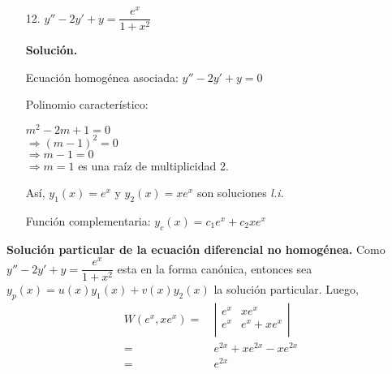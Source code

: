 \documentclass{beamer}
\begin{document}
    \begin{frame}
        \begin{enumerate}
        \item[12.] $ y'' - 2y' + y = \dfrac{e^x}{1+x^2} $ 
            
            \vspace{2.7mm}
            \textbf{Solución.}

            \vspace{0.6mm}
            Ecuación homogénea asociada: $ y'' - 2y' + y = 0 $ 

            \vspace{0.6mm}
            Polinomio característico:

            \vspace{0.6mm}
            $ m^2 - 2m + 1 = 0 $ \\
            $ \Longrightarrow (m - 1)^2 = 0 $ \\
            $ \Longrightarrow m - 1 = 0 $ \\
            $ \Longrightarrow m = 1 $ \; es una raíz de multiplicidad 2.

            \vspace{0.6mm}
            Así, $ y_1(x) = e^x $ y $ y_2(x) = xe^x $ son soluciones \emph{l.i.}

            \vspace{0.6mm}
            Función complementaria: $ y_c(x) = c_1e^x + c_2xe^x $
        \end{enumerate}
    \end{frame}
    \begin{frame}
        \textbf{Solución particular de la ecuación diferencial no homogénea.}
        Como $ \displaystyle y'' - 2y' + y = \dfrac{e^x}{1 + x^2} $ esta en la forma canónica, entonces sea $ \displaystyle y_p(x) = u(x)y_1(x) + v(x)y_2(x) $ la solución particular. Luego,
        \begin{align*}
            W(e^x, xe^x) =& ~
            \left\lvert 
                \begin{array}{ccc}
                    e^x & xe^x \\
                    e^x & e^x + xe^x \\
                \end{array}
            \right\rvert \\
            =& ~ e^{2x} + xe^{2x} - xe^{2x} \\
            =& ~ e^{2x}
        \end{align*}
    \end{frame}
\end{document}

